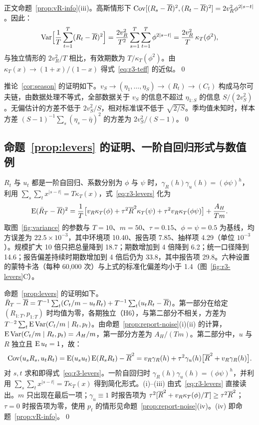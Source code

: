 正文命题~\ref{prop:vR-info}(iii)。高斯情形下 $\operatorname{Cov}[(R_s-\overline{R})^2,(R_t-\overline{R})^2]=2v_R^2\phi^{2|s-t|}$。因此：
\begin{equation}
  \operatorname{Var}\Bigl[\frac1T\sum_{t=1}^T(R_t-\overline{R})^2\Bigr]=\frac{2v_R^2}{T^2}\sum_{s=1}^{T}\sum_{t=1}^{T}\phi^{2|s-t|}=\frac{2v_R^2}{T}\,\kappa_T(\phi^2),
\end{equation}
与独立情形的 $2v_R^2/T$ 相比，有效期数为 $T/\kappa_T(\phi^2)$。由 $\kappa_T(x)\to(1+x)/(1-x)$ 得式~\eqref{eq:r3-teff} 的近似。\qed

推论~\ref{cor:season} 的证明如下。$v_S\to(\eta_1,\dots,\eta_S)\to(R_t)\to(C_t)$ 构成马尔可夫链，由数据处理不等式，全部数据关于 $v_S$ 的信息不超过 $\eta_{1:S}$ 的信息 $S/(2v_S^2)$。无偏估计的方差不低于 $2v_S^2/S$，相对标准误不低于 $\sqrt{2/S}$。季均值未知时，样本方差 $(S-1)^{-1}\sum_s(\eta_s-\bar\eta)^2$ 的方差为 $2v_S^2/(S-1)$。\qed

\subsection{\texorpdfstring{命题~\ref{prop:levers} 的证明、一阶自回归形式与数值例}{命题 6 的证明、一阶自回归形式与数值例}}
\label{app:levers-num}\label{sec:s-levers}

$R_t$ 与 $u_t$ 都是一阶自回归、系数分别为 $\phi$ 与 $\psi$ 时，$\gamma_R(h)\gamma_u(h)=(\phi\psi)^h$，利用 $\sum_s\sum_tx^{|s-t|}=T\kappa_T(x)$，式~\eqref{eq:r3-levers} 化为
\begin{equation}
  \operatorname{E}(\bar R_T-\overline{R})^2=\frac1T\bigl[v_R\kappa_T(\phi)+\tau^2\overline{R}^2\kappa_T(\psi)+\tau^2v_R\kappa_T(\phi\psi)\bigr]+\frac{A_H}{Tm}.
\end{equation}
取图~\ref{fig:variance} 的参数与 $T=10$、$m=50$、$\tau=0.15$、$\phi=\psi=0.5$ 为基线，均方误差为 $22.5\times10^{-3}$，其中环境项 10.40、报告项 7.85、抽样项 4.29（单位 $10^{-3}$）。规模扩大 10 倍只把总量降到 18.7；期数增加到 4 倍降到 6.2；统一口径降到 14.6；报告偏差持续时期数增加到 4 倍后仍为 33.8，其中报告项 29.8。六种设置的蒙特卡洛（每种 60,000 次）与上式的标准化偏差均小于 1.4（图~\ref{fig:r3-levers}C）。

命题~\ref{prop:levers} 的证明如下。$\bar R_T-\overline{R}=T^{-1}\sum_t(C_t/m-u_tR_t)+T^{-1}\sum_t(u_tR_t-\overline{R})$。第一部分在给定 $(R_{1:T},p_{1:T})$ 时均值为零，各期独立（H6），与第二部分不相关，方差为 $T^{-2}\sum_t\operatorname{E}\operatorname{Var}(C_t/m\mid R_t,p_t)$。由命题~\ref{prop:report-noise}(i)(ii) 的计算，$\operatorname{E}\operatorname{Var}(C_t/m\mid R_t,p_t)=A_H/m$，第一部分方差为 $A_H/(Tm)$。第二部分中，$u$ 与 $R$ 独立且 $\operatorname{E} u_t=1$，故：
\begin{equation}
  \operatorname{Cov}(u_sR_s,u_tR_t)=\operatorname{E}(u_su_t)\operatorname{E}(R_sR_t)-\overline{R}^2=v_R\gamma_R(h)+\tau^2\gamma_u(h)\bigl[\overline{R}^2+v_R\gamma_R(h)\bigr].
\end{equation}
对 $s,t$ 求和即得式~\eqref{eq:r3-levers}。一阶自回归时 $\gamma_R(h)\gamma_u(h)=(\phi\psi)^h$，并利用 $\sum_s\sum_tx^{|s-t|}=T\kappa_T(x)$ 得到简化形式。(i)--(iii) 由式~\eqref{eq:r3-levers} 直接读出。$m$ 只出现在最后一项；$\gamma_u\equiv1$ 时报告项为 $\tau^2[\overline{R}^2+v_R\kappa_T(\phi)/T]\geq\tau^2\overline{R}^2$；$\tau=0$ 时报告项为零，使用 $p_t$ 的情形见命题~\ref{prop:report-noise}(iv)。(iv) 即命题~\ref{prop:vR-info}。\qed

